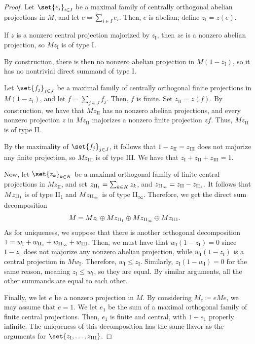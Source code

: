 \documentclass[10pt]{mypackage}
\renewcommand{\coloneq}{\coloneqq}
\begin{document}
\begin{proof}
  Let $\set{e_i}_{i\in I}$ be a maximal family of centrally orthogonal abelian projections in $M$, and let $e = \sum_{i\in I}e_i$. Then, $e$ is abelian; define $z_{\text{I}} = z(e)$.

  If $z$ is a nonzero central projection majorized by $z_{\text{I}}$, then $ze$ is a nonzero abelian projection, so $Mz_{\text{I}}$ is of type I.

  By construction, there is then no nonzero abelian projection in $M\left( 1-z_{\text{I}} \right)$, so it has no nontrivial direct summand of type I.

  Let $\set{f_j}_{j\in J}$ be a maximal family of centrally orthogonal finite projections in $M\left( 1-z_{\text{I}} \right)$, and let $f = \sum_{j\in J}f_j$. Then, $f$ is finite. Set $z_{\text{II}} = z(f)$. By construction, we have that $Mz_{\text{II}}$ has no nonzero abelian projections, and every nonzero projection $z$ in $M z_{\text{II}}$ majorizes a nonzero finite projection $zf$. Thus, $Mz_{\text{II}}$ is of type II.

  By the maximality of $\set{f_j}_{j\in J}$, it follows that $1-z_{\text{II}} = z_{\text{III}}$ does not majorize any finite projection, so $Mz_{\text{III}}$ is of type III. We have that $z_{\text{I}} + z_{\text{II}} + z_{\text{III}} = 1$.

  Now, let $\set{z_k}_{k\in K}$ be a maximal orthogonal family of finite central projections in $Mz_{\text{II}}$, and set $z_{\text{II\textsubscript{1}}} = \sum_{k\in K}z_k$, and $z_{\text{II\textsubscript{$\infty$}}} = z_{\text{II}} - z_{\text{II\textsubscript{1}}}$. It follows that $Mz_{\text{II\textsubscript{1}}}$ is of type II\textsubscript{1} and $Mz_{\text{II\textsubscript{$\infty$}}}$ is of type II\textsubscript{$\infty$}. Therefore, we get the direct sum decomposition
  \begin{align*}
    M &= Mz_{\text{I}} \oplus Mz_{\text{II\textsubscript{1}}}\oplus Mz_{\text{II\textsubscript{$\infty$}}} \oplus Mz_{\text{III}}.
  \end{align*}
  As for uniqueness, we suppose that there is another orthogonal decomposition $1 = w_{\text{I}} + w_{\text{II\textsubscript{1}}} + w_{\text{II\textsubscript{$\infty$}}} + w_{\text{III}}$. Then, we must have that $w_{\text{I}}\left( 1-z_{\text{I}} \right) = 0$ since $1-z_{\text{I}}$ does not majorize any nonzero abelian projection, while $w_{\text{I}}\left( 1-z_{\text{I}} \right)$ is a central projection in $Mw_{\text{I}}$. Therefore, $w_{\text{I}}\leq z_{\text{I}}$. Similarly, $z_{\text{I}}\left( 1-w_{\text{I}} \right) = 0$ for the same reason, meaning $z_{\text{I}}\leq w_{\text{I}}$, so they are equal. By similar arguments, all the other summands are equal to each other.

  Finally, we let $e$ be a nonzero projection in $M$. By considering $M_e\coloneq eMe$, we may assume that $e = 1$. We let $e_1$ be the sum of a maximal orthogonal family of finite central projections. Then, $e_1$ is finite and central, with $1-e_1$ properly infinite. The uniqueness of this decomposition has the same flavor as the arguments for $\set{z_{\text{I}},\dots,z_{\text{III}}}$.
\end{proof}
\end{document}
